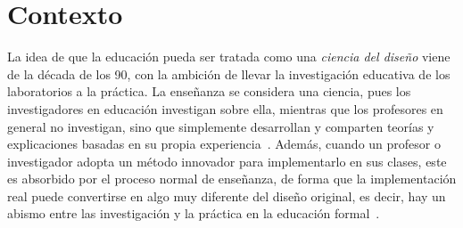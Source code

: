
\section{Contexto}
\label{sec:contexto}











La idea de que la educación pueda ser tratada como una \emph{ciencia del diseño} viene de la década de los 90, con la ambición de llevar la investigación educativa de los laboratorios a la práctica. La enseñanza se considera una ciencia, pues los investigadores en educación investigan sobre ella, mientras que los profesores en general no investigan, sino que simplemente desarrollan y comparten teorías y explicaciones basadas en su propia experiencia~\cite{laurillard2012teaching}. Además, cuando un profesor o investigador adopta un método innovador para implementarlo en sus clases, este es absorbido por el proceso normal de enseñanza, de forma que la implementación real puede convertirse en algo muy diferente del diseño original, es decir, hay un abismo entre las investigación y la práctica en la educación formal~\cite{anderson2012design}. 

